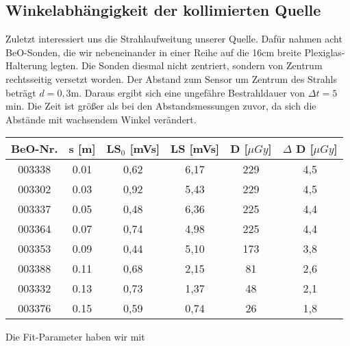 \subsection{Winkelabhängigkeit der kollimierten Quelle}

Zuletzt interessiert uns die Strahlaufweitung unserer Quelle. Dafür nahmen acht BeO-Sonden, die wir nebeneinander in einer Reihe auf die 16cm breite Plexiglas-Halterung legten. Die Sonden diesmal nicht zentriert, sondern von Zentrum rechtsseitig versetzt worden. Der Abstand zum Sensor um Zentrum des Strahls beträgt $d = 0,3$m. Daraus ergibt sich eine ungefähre Bestrahldauer von $\Delta t = 5$min. Die Zeit ist größer als bei den Abstandsmessungen zuvor, da sich die Abstände mit wachsendem Winkel verändert.

\vspace{5mm}
\minipanf
	\begin{center}
		\begin{tabular}{c|c|c|c|c|c}
				\textbf{BeO-Nr.}& \textbf{s} [m] & \textbf{LS$_0$} [mVs] & \textbf{LS} [mVs] & \textbf{D} [$\mu Gy$] & $\Delta$ \textbf{D} [$\mu Gy$] \\
		 \hline 003338 &  0.01 & 0,62 & 6,17 & 229 & 4,5 \\
				003302 &  0.03 & 0,92 & 5,43 & 229 & 4,5 \\
				003337 &  0.05 & 0,48 & 6,36 & 225 & 4,4 \\
				003364 &  0.07 & 0,74 & 4,98 & 225 & 4,4 \\
				003353 &  0.09 & 0,44 & 5,10 & 173 & 3,8 \\
				003388 & 0.11	& 0,68 & 2,15 & 81 & 2,6 \\
				003332 & 0.13 & 0,73 & 1,37 & 48 & 2,1 \\
				003376 & 0.15 & 0,59 & 0,74 & 26 & 1,8 \\
		\end{tabular}
        \label{dft:Aufweitung}
	\end{center} 
\minipend
\vspace{5mm}

Die Fit-Parameter haben wir mit 

